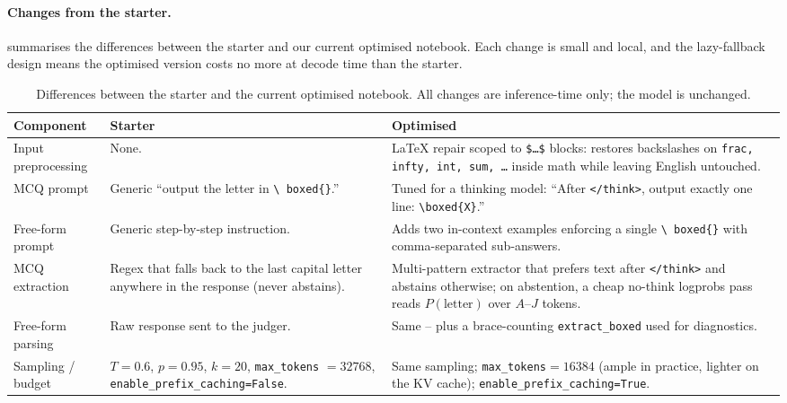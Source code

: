 \documentclass{article}
\begin{document}
\paragraph{Changes from the starter.}
 summarises the differences between the starter and our
current optimised notebook. Each change is small and local, and the
lazy-fallback design means the optimised version costs no more at decode time
than the starter.

\begin{table}[h]
  \caption{Differences between the starter and the current optimised
    notebook. All changes are inference-time only; the model is unchanged.}
  \label{tab:changes}
  \centering
  \footnotesize
  \begin{tabular}{lp{4.6cm}p{4.6cm}}
    \toprule
    Component & Starter & Optimised \\
    \midrule
    Input preprocessing & None. & LaTeX repair scoped to \texttt{\$\ldots\$}
      blocks: restores backslashes on \texttt{frac, infty, int, sum, \ldots}
      inside math while leaving English untouched. \\[2pt]
    MCQ prompt & Generic ``output the letter in \texttt{\textbackslash
      boxed\{\}}.'' & Tuned for a thinking model: ``After \texttt{</think>},
      output exactly one line: \texttt{\textbackslash boxed\{X\}}.'' \\[2pt]
    Free-form prompt & Generic step-by-step instruction. & Adds two
      in-context examples enforcing a single \texttt{\textbackslash
      boxed\{\}} with comma-separated sub-answers. \\[2pt]
    MCQ extraction & Regex that falls back to the last capital letter
      anywhere in the response (never abstains). & Multi-pattern extractor
      that prefers text after \texttt{</think>} and abstains otherwise; on
      abstention, a cheap no-think logprobs pass reads $P(\text{letter})$
      over $A$--$J$ tokens. \\[2pt]
    Free-form parsing & Raw response sent to the judger. & Same -- plus a
      brace-counting \texttt{extract\_boxed} used for diagnostics. \\[2pt]
    Sampling / budget & $T{=}0.6$, $p{=}0.95$, $k{=}20$, \texttt{max\_tokens}
      $=32768$, \texttt{enable\_prefix\_caching=False}. & Same sampling;
      \texttt{max\_tokens}$=16384$ (ample in practice, lighter on the KV
      cache); \texttt{enable\_prefix\_caching=True}. \\
    \bottomrule
  \end{tabular}
\end{table}
\end{document}

